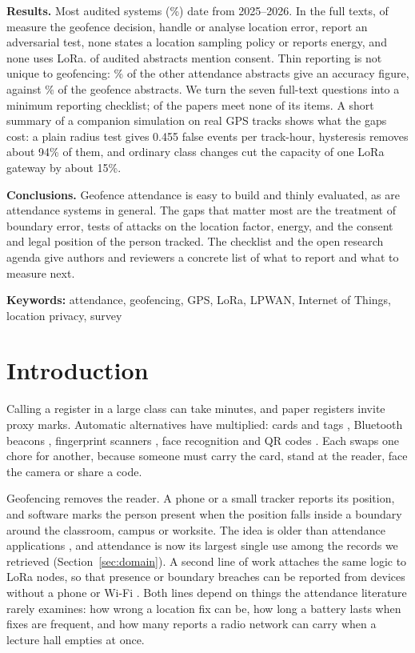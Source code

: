 \documentclass[12pt]{article}
\let\cite\citep
\begin{document}
\textbf{Results.} Most audited systems (\pRecent\%) date from 2025--2026. In the full texts, \ftQtwo{} of \ftN{} measure the geofence decision, \ftQone{} handle or analyse location error, \ftQthree{} report an adversarial test, none states a location sampling policy or reports energy, and none uses LoRa. \hfConsent{} of \hfN{} audited abstracts mention consent. Thin reporting is not unique to geofencing: \cmpOacc\% of the other attendance abstracts give an accuracy figure, against \cmpGacc\% of the geofence abstracts. We turn the seven full-text questions into a minimum reporting checklist; \ftScoreZero{} of the \ftN{} papers meet none of its items. A short summary of a companion simulation on real GPS tracks shows what the gaps cost: a plain radius test gives 0.455 false events per track-hour, hysteresis removes about 94\% of them, and ordinary class changes cut the capacity of one LoRa gateway by about 15\%.

\textbf{Conclusions.} Geofence attendance is easy to build and thinly evaluated, as are attendance systems in general. The gaps that matter most are the treatment of boundary error, tests of attacks on the location factor, energy, and the consent and legal position of the person tracked. The checklist and the open research agenda give authors and reviewers a concrete list of what to report and what to measure next.

\noindent\textbf{Keywords:} attendance, geofencing, GPS, LoRa, LPWAN, Internet of Things, location privacy, survey

\linenumbers


\section{Introduction}
Calling a register in a large class can take minutes, and paper registers invite proxy marks. Automatic alternatives have multiplied: cards and tags \cite{lim2009rfid,kassim2012based,koppikar2019based}, Bluetooth beacons \cite{noguchi2015student,lodha2015bluetooth}, fingerprint scanners \cite{mohamed2012fingerprint,mittal2015fingerprint}, face recognition \cite{bah2020improved,arsenovic2017facetime,alhanaee2021face} and QR codes \cite{masalha2014students}. Each swaps one chore for another, because someone must carry the card, stand at the reader, face the camera or share a code.

Geofencing removes the reader. A phone or a small tracker reports its position, and software marks the person present when the position falls inside a boundary around the classroom, campus or worksite. The idea is older than attendance applications \cite{reclus2009geofencing,rodriguezgarzon2014geofencing}, and attendance is now its largest single use among the records we retrieved (Section~\ref{sec:domain}). A second line of work attaches the same logic to LoRa nodes, so that presence or boundary breaches can be reported from devices without a phone or Wi-Fi \cite{ahmed2024scalable,j2026fencing}. Both lines depend on things the attendance literature rarely examines: how wrong a location fix can be, how long a battery lasts when fixes are frequent, and how many reports a radio network can carry when a lecture hall empties at once.
\end{document}
